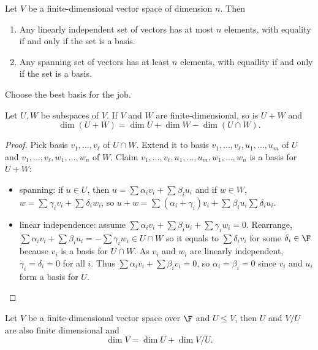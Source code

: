 \documentclass[a4paper]{article}
\theoremstyle{definition}
\begin{document}
\begin{cor}
  Let \(V\) be a finite-dimensional vector space of dimension \(n\). Then
  \begin{enumerate}
  \item Any linearly independent set of vectors has at most \(n\) elements, with equality if and only if the set is a basis.
  \item Any spanning set of vectors has at least \(n\) elements, with equaility if and only if the set is a basis.
  \end{enumerate}
\end{cor}

\begin{slogan}
  Choose the best basis for the job.
\end{slogan}

\begin{thm}
  Let \(U, W\) be subspaces of \(V\). If \(V\) and \(W\) are finite-dimensional, so is \(U+W\) and
  \[
\dim(U+W) = \dim U + \dim W - \dim(U\cap W).
  \]
\end{thm}

\begin{proof}
  Pick basis \(v_1,\ldots, v_\ell\) of \(U\cap W\). Extend it to basis \(v_1,\ldots,v_\ell,u_1,\ldots,u_m\) of \(U\) and \(v_1,\ldots,v_\ell,w_1,\ldots,w_n\) of \(W\). Claim \(v_1,\ldots, v_\ell,u_1,\ldots,u_m,w_1,\ldots,w_n\) is a basis for \(U+W\):
  \begin{itemize}
  \item spanning: if \(u\in U\), then \(u= \sum \alpha_iv_i + \sum \beta_iu_i\) and if \(w\in W\), \(w = \sum_{}^{}\gamma_iv_i + \sum_{}^{}\delta_iw_i\), so \(u+w = \sum_{}^{}(\alpha_i + \gamma_i)v_i + \sum_{}^{}\beta_iu_i \sum_{}^{}\delta_iu_i\).
  \item linear independence: assume \(\sum \alpha_iv_i + \sum \beta_iu_i+ \sum \gamma_iw_i=0\). Rearrange, \(\sum\alpha_iv_i + \sum\beta_iu_i = -\sum\gamma_iw_i \in U\cap W\) so it equals to \(\sum\delta_iv_i\) for some \(\delta_i\in \F\) because \(v_i\) is a basis for \(U\cap W\). As \(v_i\) and \(w_i\) are linearly independent, \(\gamma_i=\delta_i=0\) for all \(i\). Thus \(\sum\alpha_iv_i + \sum\beta_iv_i=0\), so \(\alpha_i=\beta_i=0\) since \(v_i\) and \(u_i\) form a basis for \(U\).
  \end{itemize}
\end{proof}

\begin{thm}
  Let \(V\) be a finite-dimensional vector space over \(\F\) and \(U \leq V\), then \(U\) and \(V/U\) are also finite dimensional and
  \[
\dim V = \dim U + \dim V/U.
  \]
\end{thm}
\end{document}
